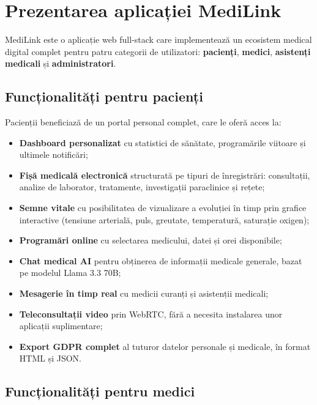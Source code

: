 \section{Prezentarea aplicației MediLink}

MediLink este o aplicație web full-stack care implementează un ecosistem medical digital complet pentru patru categorii de utilizatori: \textbf{pacienți}, \textbf{medici}, \textbf{asistenți medicali} și \textbf{administratori}.

\subsection{Funcționalități pentru pacienți}

Pacienții beneficiază de un portal personal complet, care le oferă acces la:
\begin{itemize}
  \item \textbf{Dashboard personalizat} cu statistici de sănătate, programările viitoare și ultimele notificări;
  \item \textbf{Fișă medicală electronică} structurată pe tipuri de înregistrări: consultații, analize de laborator, tratamente, investigații paraclinice și rețete;
  \item \textbf{Semne vitale} cu posibilitatea de vizualizare a evoluției în timp prin grafice interactive (tensiune arterială, puls, greutate, temperatură, saturație oxigen);
  \item \textbf{Programări online} cu selectarea medicului, datei și orei disponibile;
  \item \textbf{Chat medical AI} pentru obținerea de informații medicale generale, bazat pe modelul Llama 3.3 70B;
  \item \textbf{Mesagerie în timp real} cu medicii curanți și asistenții medicali;
  \item \textbf{Teleconsultații video} prin WebRTC, fără a necesita instalarea unor aplicații suplimentare;
  \item \textbf{Export GDPR complet} al tuturor datelor personale și medicale, în format HTML și JSON.
\end{itemize}

\subsection{Funcționalități pentru medici}

